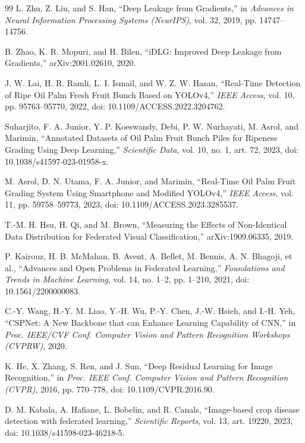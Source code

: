 \documentclass[11pt]{article}
\begin{document}
\begin{thebibliography}{99}
 L. Zhu, Z. Liu, and S. Han, ``Deep Leakage from Gradients,'' in \emph{Advances in Neural Information Processing Systems (NeurIPS)}, vol. 32, 2019, pp. 14747--14756.

 B. Zhao, K. R. Mopuri, and H. Bilen, ``iDLG: Improved Deep Leakage from Gradients,'' arXiv:2001.02610, 2020.

 J. W. Lai, H. R. Ramli, L. I. Ismail, and W. Z. W. Hasan, ``Real-Time Detection of Ripe Oil Palm Fresh Fruit Bunch Based on YOLOv4,'' \emph{IEEE Access}, vol. 10, pp. 95763--95770, 2022, doi: 10.1109/ACCESS.2022.3204762.

 Suharjito, F. A. Junior, Y. P. Koeswandy, Debi, P. W. Nurhayati, M. Asrol, and Marimin, ``Annotated Datasets of Oil Palm Fruit Bunch Piles for Ripeness Grading Using Deep Learning,'' \emph{Scientific Data}, vol. 10, no. 1, art. 72, 2023, doi: 10.1038/s41597-023-01958-x.

 M. Asrol, D. N. Utama, F. A. Junior, and Marimin, ``Real-Time Oil Palm Fruit Grading System Using Smartphone and Modified YOLOv4,'' \emph{IEEE Access}, vol. 11, pp. 59758--59773, 2023, doi: 10.1109/ACCESS.2023.3285537.

 T.-M. H. Hsu, H. Qi, and M. Brown, ``Measuring the Effects of Non-Identical Data Distribution for Federated Visual Classification,'' arXiv:1909.06335, 2019.

 P. Kairouz, H. B. McMahan, B. Avent, A. Bellet, M. Bennis, A. N. Bhagoji, et al., ``Advances and Open Problems in Federated Learning,'' \emph{Foundations and Trends in Machine Learning}, vol. 14, no. 1--2, pp. 1--210, 2021, doi: 10.1561/2200000083.

 C.-Y. Wang, H.-Y. M. Liao, Y.-H. Wu, P.-Y. Chen, J.-W. Hsieh, and I.-H. Yeh, ``CSPNet: A New Backbone that can Enhance Learning Capability of CNN,'' in \emph{Proc. IEEE/CVF Conf. Computer Vision and Pattern Recognition Workshops (CVPRW)}, 2020.

 K. He, X. Zhang, S. Ren, and J. Sun, ``Deep Residual Learning for Image Recognition,'' in \emph{Proc. IEEE Conf. Computer Vision and Pattern Recognition (CVPR)}, 2016, pp. 770--778, doi: 10.1109/CVPR.2016.90.

 D. M. Kabala, A. Hafiane, L. Bobelin, and R. Canals, ``Image-based crop disease detection with federated learning,'' \emph{Scientific Reports}, vol. 13, art. 19220, 2023, doi: 10.1038/s41598-023-46218-5.


\end{thebibliography}
\end{document}
